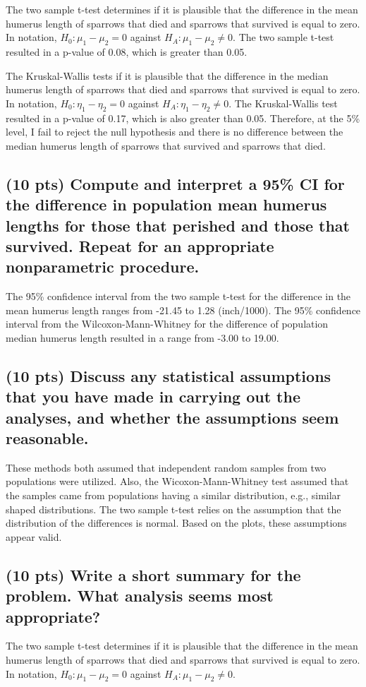 \documentclass{article}\usepackage[]{graphicx}\usepackage[]{color}
\begin{document}
The two sample t-test determines if it is plausible that the
difference in the mean humerus length of sparrows that died and sparrows that survived
is equal to zero.  In notation,
$H_0: \mu_1 - \mu_2 = 0$ against $H_A: \mu_1 - \mu_2 \ne 0$.  The two sample t-test resulted in a p-value
 of 0.08, which is greater than 0.05.

The Kruskal-Wallis tests if it is plausible that the
difference in the median humerus length of sparrows that died and sparrows that survived
is equal to zero.  In notation,
$H_0: \eta_1 - \eta_2 = 0$ against $H_A: \eta_1 - \eta_2 \ne 0$.  The Kruskal-Wallis test resulted in a p-value of 0.17, which
 is also greater than 0.05.  Therefore, at the 5\% level, I fail to reject the null
 hypothesis and there is no difference between
 the median humerus length of sparrows that survived and sparrows that died.

 \subsection{(10 pts) Compute and interpret a 95\% CI for the difference in population mean humerus lengths for
those that perished and those that survived. Repeat for an appropriate nonparametric procedure.}

The 95\% confidence interval from the two sample t-test for the difference in the mean
humerus length ranges from -21.45 to 1.28 (inch/1000).  The 95\% confidence interval from the
Wilcoxon-Mann-Whitney for the difference of population median humerus length resulted in a range from -3.00 to
19.00.

\subsection{(10 pts) Discuss any statistical assumptions that you have made in carrying out the analyses, and
whether the assumptions seem reasonable.}
These methods both assumed that independent random samples from two populations were utilized.
Also, the Wicoxon-Mann-Whitney test assumed that the samples came from populations having
a similar distribution, e.g., similar shaped distributions.
The two sample t-test relies on the assumption that the
distribution of the differences is normal.  Based on the plots, these assumptions
appear valid.

\subsection{(10 pts) Write a short summary for the problem. What analysis seems most appropriate?}
The two sample t-test determines if it is plausible that the
difference in the mean humerus length of sparrows that died and sparrows that survived
is equal to zero.  In notation,
$H_0: \mu_1 - \mu_2 = 0$ against $H_A: \mu_1 - \mu_2 \ne 0$.
\end{document}
